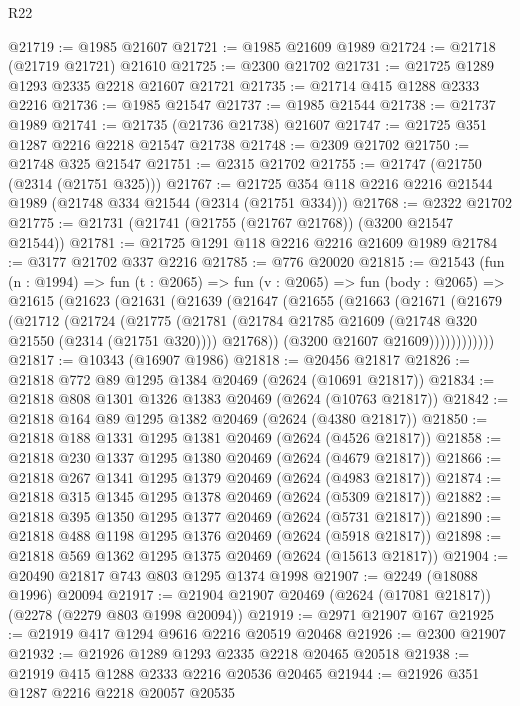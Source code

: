 \begin{lexlean}{R22}
\begin{coremodule}
@21719 := @1985 @21607
@21721 := @1985 @21609 @1989
@21724 := @21718 (@21719 @21721) @21610
@21725 := @2300 @21702
@21731 := @21725 @1289 @1293 @2335 @2218 @21607 @21721
@21735 := @21714 @415 @1288 @2333 @2216
@21736 := @1985 @21547
@21737 := @1985 @21544
@21738 := @21737 @1989
@21741 := @21735 (@21736 @21738) @21607
@21747 := @21725 @351 @1287 @2216 @2218 @21547 @21738
@21748 := @2309 @21702
@21750 := @21748 @325 @21547
@21751 := @2315 @21702
@21755 := @21747 (@21750 (@2314 (@21751 @325)))
@21767 := @21725 @354 @118 @2216 @2216 @21544 @1989 (@21748 @334 @21544 (@2314 (@21751 @334)))
@21768 := @2322 @21702
@21775 := @21731 (@21741 (@21755 (@21767 @21768)) (@3200 @21547 @21544))
@21781 := @21725 @1291 @118 @2216 @2216 @21609 @1989
@21784 := @3177 @21702 @337 @2216
@21785 := @776 @20020
@21815 := @21543
    (fun (n : @1994) =>
    fun (t : @2065) =>
    fun (v : @2065) =>
    fun (body : @2065) =>
    @21615
      (@21623
        (@21631
          (@21639
            (@21647
              (@21655
                (@21663
                  (@21671
                    (@21679
                      (@21712
                        (@21724
                          (@21775
                            (@21781
                              (@21784 @21785 @21609 (@21748 @320 @21550 (@2314 (@21751 @320))))
                              @21768))
                          (@3200 @21607 @21609))))))))))))
@21817 := @10343 (@16907 @1986)
@21818 := @20456 @21817
@21826 := @21818 @772 @89 @1295 @1384 @20469 (@2624 (@10691 @21817))
@21834 := @21818 @808 @1301 @1326 @1383 @20469 (@2624 (@10763 @21817))
@21842 := @21818 @164 @89 @1295 @1382 @20469 (@2624 (@4380 @21817))
@21850 := @21818 @188 @1331 @1295 @1381 @20469 (@2624 (@4526 @21817))
@21858 := @21818 @230 @1337 @1295 @1380 @20469 (@2624 (@4679 @21817))
@21866 := @21818 @267 @1341 @1295 @1379 @20469 (@2624 (@4983 @21817))
@21874 := @21818 @315 @1345 @1295 @1378 @20469 (@2624 (@5309 @21817))
@21882 := @21818 @395 @1350 @1295 @1377 @20469 (@2624 (@5731 @21817))
@21890 := @21818 @488 @1198 @1295 @1376 @20469 (@2624 (@5918 @21817))
@21898 := @21818 @569 @1362 @1295 @1375 @20469 (@2624 (@15613 @21817))
@21904 := @20490 @21817 @743 @803 @1295 @1374 @1998
@21907 := @2249 (@18088 @1996) @20094
@21917 := @21904 @21907 @20469 (@2624 (@17081 @21817)) (@2278 (@2279 @803 @1998 @20094))
@21919 := @2971 @21907 @167
@21925 := @21919 @417 @1294 @9616 @2216 @20519 @20468
@21926 := @2300 @21907
@21932 := @21926 @1289 @1293 @2335 @2218 @20465 @20518
@21938 := @21919 @415 @1288 @2333 @2216 @20536 @20465
@21944 := @21926 @351 @1287 @2216 @2218 @20057 @20535

\end{coremodule}
\end{lexlean}
